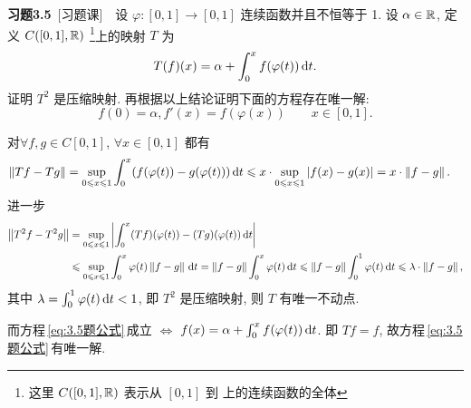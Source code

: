 	\textbf{习题3.5}\ [习题课]\ \ 设 $ \varphi:[0, 1]\to [0, 1] $ 连续函数并且不恒等于 1. 设 $ \alpha\in\mathbb{R} $, 定义 $ C([0, 1],\mathbb{R}) $ \footnote{这里 $ C([0, 1],\mathbb{R}) $ 表示从 $ [0, 1] $ 到 \R 上的连续函数的全体 }上的映射 $ T $ 为
	\[
		T(f)(x)=\alpha+\int_{0}^{x}f(\varphi(t))\,\mathrm{d} t.
	\]
	证明 $ T^2 $ 是压缩映射. 再根据以上结论证明下面的方程存在唯一解:
	\begin{equation}\label{eq:3.5题公式}
		f(0)=\alpha, f'(x)=f(\varphi(x))\qquad x\in[0, 1].
	\end{equation}

	\begin{Proof}
		对$\forall f, g\in C[0, 1]$, $ \forall x\in[0, 1] $ 都有
		\[
			\begin{aligned}
				\left\| Tf-Tg \right\| & =\sup_{0\leqslant x\leqslant 1}\int_{0}^{x}(f(\varphi(t))-g(\varphi(t)))\,\mathrm{d} t \leqslant x\cdot \sup_{0\leqslant x\leqslant 1}\left| f(x)-g(x) \right|  = x\cdot \left\| f-g \right\|.
			\end{aligned}
		\]
		进一步 
		\[
			\begin{aligned}
				\left\| T^{2}f-T^{2}g \right\| & =\sup_{0\leqslant x\leqslant 1}\left| \int_{0}^{x}(Tf)(\varphi(t))-(Tg)(\varphi(t))\,\mathrm{d} t \right|  \\
				& \leqslant\sup_{0\leqslant x\leqslant 1}\int_{0}^{x}\varphi (t)\left\| f-g \right\|\,\mathrm{d} t  =\left\| f-g \right\|\int_{0}^{x}\varphi(t)\,\mathrm{d} t  \leqslant\left\| f-g \right\|\int_{0}^{1}\varphi(t)\,\mathrm{d} t \leqslant\lambda\cdot\left\| f-g \right\|,
			\end{aligned}
		\]
		其中 $ \lambda=\int_{0}^{1}\varphi(t)\,\mathrm{d} t<1 $, 即 $ T^{2} $ 是压缩映射, 则 $ T $ 有唯一不动点.

		而方程\,\eqref{eq:3.5题公式}\,成立 $ \Longleftrightarrow $ $ f(x)=\alpha +\int_{0}^{x} f(\varphi(t))\,\mathrm{d} t $. 即 $ Tf=f $, 故方程\,\eqref{eq:3.5题公式}\,有唯一解. 
	\end{Proof}
	
